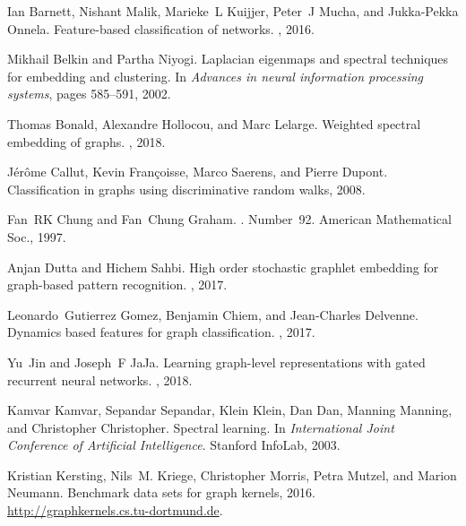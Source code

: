 \documentclass{article}
\begin{document}
\begin{thebibliography}{10}

Ian Barnett, Nishant Malik, Marieke~L Kuijjer, Peter~J Mucha, and Jukka-Pekka
  Onnela.
\newblock Feature-based classification of networks.
, 2016.

Mikhail Belkin and Partha Niyogi.
\newblock Laplacian eigenmaps and spectral techniques for embedding and
  clustering.
\newblock In {\em Advances in neural information processing systems}, pages
  585--591, 2002.

Thomas Bonald, Alexandre Hollocou, and Marc Lelarge.
\newblock Weighted spectral embedding of graphs.
, 2018.

J{\'e}r{\^o}me Callut, Kevin Fran{\c{c}}oisse, Marco Saerens, and Pierre
  Dupont.
\newblock Classification in graphs using discriminative random walks, 2008.

Fan~RK Chung and Fan~Chung Graham.
.
\newblock Number~92. American Mathematical Soc., 1997.

Anjan Dutta and Hichem Sahbi.
\newblock High order stochastic graphlet embedding for graph-based pattern
  recognition.
, 2017.

Leonardo~Gutierrez Gomez, Benjamin Chiem, and Jean-Charles Delvenne.
\newblock Dynamics based features for graph classification.
, 2017.

Yu~Jin and Joseph~F JaJa.
\newblock Learning graph-level representations with gated recurrent neural
  networks.
, 2018.

Kamvar Kamvar, Sepandar Sepandar, Klein Klein, Dan Dan, Manning Manning, and
  Christopher Christopher.
\newblock Spectral learning.
\newblock In {\em International Joint Conference of Artificial Intelligence}.
  Stanford InfoLab, 2003.

Kristian Kersting, Nils~M. Kriege, Christopher Morris, Petra Mutzel, and Marion
  Neumann.
\newblock Benchmark data sets for graph kernels, 2016.
\newblock \url{http://graphkernels.cs.tu-dortmund.de}.


\end{thebibliography}
\end{document}
